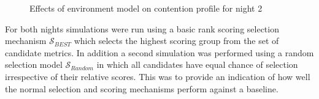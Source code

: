 \begin{figure}[h]
\begin{center}
 \caption{Effects of environment model on contention profile for night 2}
  
 \end{center}
\end{figure}


For both nights simulations were run using a basic rank scoring selection mechanism $\mathcal{S}_{BEST}$ which selects the highest scoring group from the set of candidate metrics. In addition a second simulation was performed using a random selection model $\mathcal{S}_{Random}$ in which all candidates have equal chance of selection irrespective of their relative scores. This was to provide an indication of how well the normal selection and scoring mechanisms perform against a baseline.

